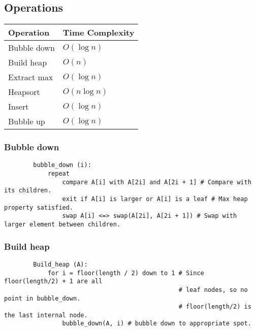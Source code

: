 \documentclass{article}
\begin{document}
\subsection{Operations}
\begin{summary}
    \begin{center}
        \begin{tabular}{p{8cm} p{8cm}}
            \hline
            \textbf{Operation} & \textbf{Time Complexity} \\ \hline
            Bubble down                & $O(\log n)$              \\ \hline
            Build heap                & $O(n)$                \\ \hline
            Extract max & $O(\log n)$ \\ \hline
            Heapsort & $O(n \log n)$ \\ \hline
            Insert & $O(\log n)$ \\ \hline 
            Bubble up & $O(\log n)$ \\ \hline 
        \end{tabular}    
    \end{center}
\end{summary}

\subsubsection{Bubble down}
\begin{algo}
    \begin{lstlisting}
        bubble_down (i):
            repeat
                compare A[i] with A[2i] and A[2i + 1] # Compare with its children.
                exit if A[i] is larger or A[i] is a leaf # Max heap property satisfied.
                swap A[i] <=> swap(A[2i], A[2i + 1]) # Swap with larger element between children.
    \end{lstlisting}
\end{algo}

\subsubsection{Build heap}
\begin{algo}
    \begin{lstlisting}
        Build_heap (A):
            for i = floor(length / 2) down to 1 # Since floor(length/2) + 1 are all
                                                # leaf nodes, so no point in bubble_down.
                                                # floor(length/2) is the last internal node.
                bubble_down(A, i) # bubble down to appropriate spot.
    \end{lstlisting}
\end{algo}
\end{document}
